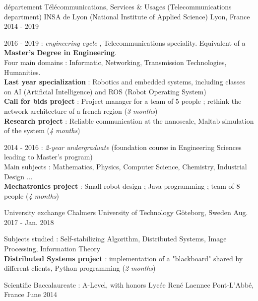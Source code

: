 

\begin{cventries}

  \cventry
    {département Télécommunications, Services \& Usages (Telecommunications department)} %
    {INSA de Lyon (National Institute of Applied Science)} %
    {Lyon, France} %
    {2014 - 2019} %
    {
      \begin{cvitems} %
        \item {2016 - 2019 : \emph{engineering cycle} , Telecommunications speciality. Equivalent of a  \textbf{Master's Degree in Engineering}. \\ 
        Four main domains : Informatic, Networking, Transmission Technologies, Humanities. \\
        \textbf{Last year specialization} : Robotics and embedded systems, including classes on AI (Artificial Intelligence) and ROS (Robot Operating System) \\        
        \textbf{Call for bids project} : Project manager for a team of 5 people ; rethink the network architecture of a french region (\textit{3 months}) \\
        \textbf{Research project} : Reliable communication at the nanoscale, Maltab simulation of the system (\textit{4 months})}
        \item {2014 - 2016 : \emph{2-year undergraduate} (foundation course in Engineering Sciences leading to Master's program) \\
        Main subjects : Mathematics, Physics, Computer Science, Chemistry, Industrial Design ... \\
        \textbf{Mechatronics project} : Small robot design ; Java programming ; team of 8 people (\textit{4 months})}
      \end{cvitems}
    } 

  \cventry
    {University exchange} %
    {Chalmers University of Technology} %
    {Göteborg, Sweden} %
    {Aug. 2017 - Jan. 2018} %
    {
      \begin{cvitems} %
        \item {Subjects studied : Self-stabilizing Algorithm, Distributed Systems, Image Processing, Information Theory\\
        \textbf{Distributed Systems project} : implementation of a "blackboard" shared by different clients, Python programming (\textit{2 months})}
      \end{cvitems}
    }

  \cventryS
    {Scientific Baccalaureate : A-Level, with honors} %
    {Lycée René Laennec} %
    {Pont-L'Abbé, France} %
    {June 2014} %
    
\end{cventries}

